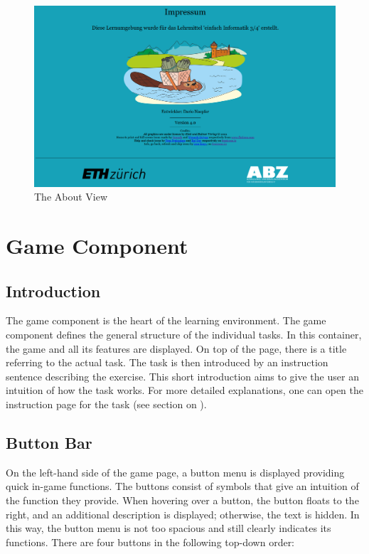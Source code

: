 \begin{figure}[H]
    \centering
    \includegraphics[width=1.0 \columnwidth]{figures/about_view.png}
    \caption{The About View} 
    \label{fig:aboutview} 
\end{figure}

\section{Game Component}
\label{section:game}

\subsection{Introduction}
The game component is the heart of the learning environment. The game component defines the general structure of the individual tasks. In this container, the game and all its features are displayed. On top of the page, there is a title referring to the actual task. The task is then introduced by an instruction sentence describing the exercise. This short introduction aims to give the user an intuition of how the task works. For more detailed explanations, one can open the instruction page for the task (see section on ).

\subsection{Button Bar}
\label{subsection:buttonbar}
On the left-hand side of the game page, a button menu is displayed providing quick in-game functions. The buttons consist of symbols that give an intuition of the function they provide. When hovering over a button, the button floats to the right, and an additional description is displayed; otherwise, the text is hidden. In this way, the button menu is not too spacious and still clearly indicates its functions. There are four buttons in the following top-down order:

